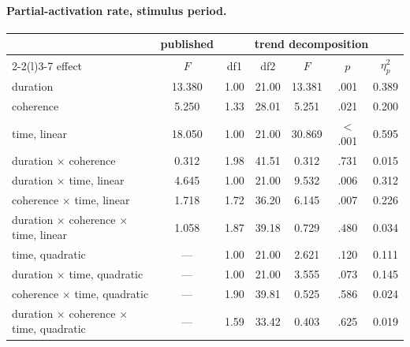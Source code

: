 \paragraph{Partial-activation rate, stimulus period.}
\begin{center}\small
\begin{tabular}{lcccccc}
\toprule
 & \multicolumn{1}{c}{published} & \multicolumn{5}{c}{trend decomposition}\\
\cmidrule(lr){2-2}\cmidrule(l){3-7}
effect & $F$ & df1 & df2 & $F$ & $p$ & $\eta_p^2$\\
\midrule
duration & 13.380 & 1.00 & 21.00 & 13.381 & .001 & 0.389\\
coherence & 5.250 & 1.33 & 28.01 & 5.251 & .021 & 0.200\\
time, linear & 18.050 & 1.00 & 21.00 & 30.869 & $<$.001 & 0.595\\
duration $\times$ coherence & 0.312 & 1.98 & 41.51 & 0.312 & .731 & 0.015\\
duration $\times$ time, linear & 4.645 & 1.00 & 21.00 & 9.532 & .006 & 0.312\\
coherence $\times$ time, linear & 1.718 & 1.72 & 36.20 & 6.145 & .007 & 0.226\\
duration $\times$ coherence $\times$ time, linear & 1.058 & 1.87 & 39.18 & 0.729 & .480 & 0.034\\
time, quadratic & --- & 1.00 & 21.00 & 2.621 & .120 & 0.111\\
duration $\times$ time, quadratic & --- & 1.00 & 21.00 & 3.555 & .073 & 0.145\\
coherence $\times$ time, quadratic & --- & 1.90 & 39.81 & 0.525 & .586 & 0.024\\
duration $\times$ coherence $\times$ time, quadratic & --- & 1.59 & 33.42 & 0.403 & .625 & 0.019\\
\bottomrule
\end{tabular}
\end{center}

